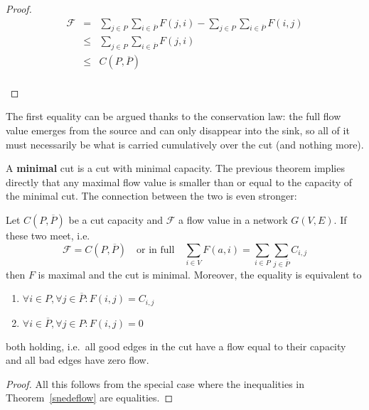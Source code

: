 \begin{proof}
\begin{eqnarray*}
\mathcal{F} %
        & = & \sum_{j \in P} \sum_{i \in \overline{P}} F(j,i) -
                \sum_{j \in P} \sum_{i \in \overline{P}} F(i,j)\\
        & \leq & \sum_{j \in P} \sum_{i \in \overline{P}} F(j,i)\\
        & \leq & C(P,\overline{P})
\end{eqnarray*}
\vspace{-3em}~\\
\end{proof}
The first equality can be argued thanks to the conservation law: the full flow value emerges from the source and can only disappear into the sink, so all of it must necessarily be what is carried cumulatively over the cut (and nothing more).

A \textbf{minimal} cut is a cut with minimal capacity. The previous
theorem implies directly that any maximal flow value is smaller than or
equal to the capacity of the minimal cut. The connection between the
two is even stronger:


 \begin{theorem}\label{maxflowmincut}
  Let $C(P,\overline{P})$ be a cut capacity and $\mathcal{F}$ a flow value in a network $G(V,E)$. If these two meet, i.e.\
\begin{equation*}
	\mathcal{F} = C(P,\overline{P})  \quad \text{or in full} \quad \sum_{i \in V} F(a,i) = \sum_{i \in P} \sum_{j \in \overline{P}} C_{i,j}
\end{equation*}
then $F$ is maximal and the cut is minimal. Moreover, the equality is equivalent to
\begin{enumerate}
	\item $\forall i \in P, \forall j \in \overline{P}: F(i,j) = C_{i,j}$
	\item $\forall i \in \overline{P}, \forall j \in P: F(i,j) = 0$
\end{enumerate}
both holding, i.e.\ all good edges in the cut have a flow equal to their capacity and
all bad edges have zero flow.
\end{theorem}
\begin{proof}
All this follows from the special case where the inequalities in Theorem~\ref{snedeflow} are equalities.
\end{proof}

